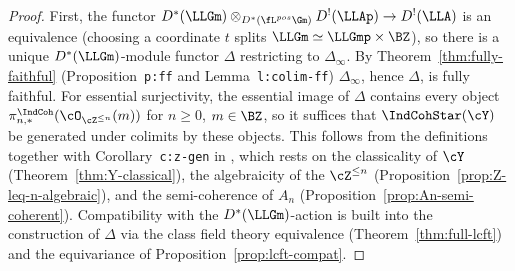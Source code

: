 \begin{proof}
  First, the functor $D^*(\LLGm)\otimes_{D^*(\fL^{pos}\Gm)} D^!(\LLAp)
  \to D^!(\LLA)$ is an equivalence (choosing a coordinate $t$ splits
  $\LLGm \simeq \LLGmp\times\BZ$), so there is a unique $D^*(\LLGm)$-module
  functor $\Delta$ restricting to $\Delta_\infty$. By
  Theorem~\ref{thm:fully-faithful} (Proposition~\texttt{p:ff} and
  Lemma~\texttt{l:colim-ff}) $\Delta_\infty$, hence $\Delta$, is fully
  faithful. For essential surjectivity, the essential image of $\Delta$
  contains every object $\pi_{n,*}^{\IndCoh}(\cO_{\cZ^{\leq n}}(m))$
  for $n \geq 0$, $m \in \BZ$, so it suffices that $\IndCohStar(\cY)$ be
  generated under colimits by these objects. This follows from the
  definitions together with Corollary~\texttt{c:z-gen} in \cite{hilburn-raskin},
  which rests on the classicality of $\cY$ (Theorem~\ref{thm:Y-classical}),
  the algebraicity of the $\cZ^{\leq n}$ (Proposition~\ref{prop:Z-leq-n-algebraic}),
  and the semi-coherence of $A_n$ (Proposition~\ref{prop:An-semi-coherent}).
  Compatibility with the $D^*(\LLGm)$-action is built into the construction
  of $\Delta$ via the class field theory equivalence
  (Theorem~\ref{thm:full-lcft}) and the equivariance of
  Proposition~\ref{prop:lcft-compat}.
\end{proof}

